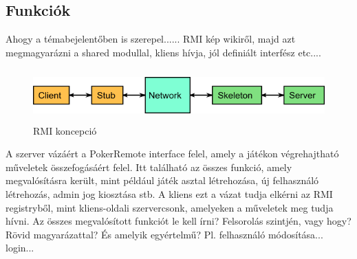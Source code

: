 \subsection{Funkciók}
Ahogy a témabejelentőben is szerepel...... RMI kép wikiről, majd azt megmagyarázni a shared modullal, kliens hívja, jól definiált interfész etc....
\begin{figure}[h!]
	\caption{RMI koncepció}
	\centering
	\includegraphics[width=14cm, height=2cm]{user-documentation/images/rmi.png}
\end{figure}
A szerver vázáért a PokerRemote interface felel, amely a játékon végrehajtható műveletek összefogásáért felel. Itt található az összes funkció, amely megvalósításra került, mint például játék asztal létrehozása, új felhasználó létrehozás, admin jog kiosztása stb. A kliens ezt a vázat tudja elkérni az RMI registryből, mint kliens-oldali szervercsonk, amelyeken a műveletek meg tudja hívni. Az összes megvalósított funkciót le kell írni? Felsorolás szintjén, vagy hogy? Rövid magyarázattal? És amelyik egyértelmű? Pl. felhasználó módosítása... login...

